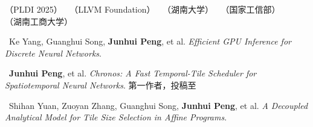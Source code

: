 \noindent
{}（PLDI 2025）$\;$\textbullet$\;$
（LLVM Foundation）$\;$\textbullet$\;$
（湖南大学）$\;$\textbullet$\;$
（国家工信部）$\;$\textbullet$\;$
$\;$\textbullet$\;$
（湖南工商大学）



\noindent [1]\ Ke Yang, Guanghui Song, \textbf{Junhui Peng}, et al.
\textit{Efficient GPU Inference for Discrete Neural Networks}.

\smallskip
\noindent [2]\ \textbf{Junhui Peng}, et al.
\textit{Chronos: A Fast Temporal-Tile Scheduler for Spatiotemporal Neural Networks}.
第一作者，投稿至 

\smallskip
\noindent [3]\ Shihan Yuan, Zuoyan Zhang, Guanghui Song, \textbf{Junhui Peng}, et al.
\textit{A Decoupled Analytical Model for Tile Size Selection in Affine Programs}.
